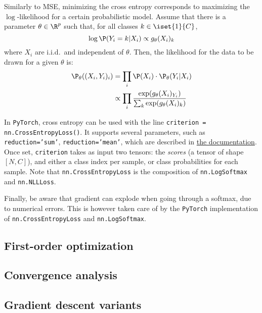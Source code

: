 Similarly to MSE, minimizing the cross entropy corresponds to maximizing the $\log$-likelihood for a certain probabilistic model. Assume that there is a parameter $\theta\in\R^p$ such that, for all classes $k\in\iset{1}{C}$,
\begin{equation*}
    \log\P(Y_i=k|X_i) \propto g_\theta(X_i)_k
\end{equation*}
where $X_i$ are i.i.d.~and independent of $\theta$. Then, the likelihood for the data to be drawn for a given $\theta$ is:
\begin{equation*}
    \begin{aligned}
        \P_\theta((X_i,Y_i)_i) &= \prod_i\P(X_i)\cdot\P_\theta(Y_i|X_i)\\
        &\propto\prod_i\frac{\exp(g_\theta(X_i)_{Y_i})}{\sum_k\exp(g_\theta(X_i)_k)}        
    \end{aligned}
\end{equation*}

In \texttt{PyTorch}, cross entropy can be used with the line \texttt{criterion = nn.CrossEntropyLoss()}. It supports several parameters, such as \texttt{reduction='sum'}, \texttt{reduction='mean'}, which are described in \href{https://pytorch.org/docs/stable/generated/torch.nn.MSELoss.html}{the documentation}. Once set, \texttt{criterion} takes as input two tensors: the \emph{scores} (a tensor of shape $[N,C]$), and either a class index per sample, or class probabilities for each sample. Note that \texttt{nn.CrossEntropyLoss} is the composition of \texttt{nn.LogSoftmax} and \texttt{nn.NLLLoss}.

Finally, be aware that gradient can explode when going through a softmax, due to numerical errors. This is however taken care of by the \texttt{PyTorch} implementation of \texttt{nn.CrossEntropyLoss} and \texttt{nn.LogSoftmax}.

\subsection{First-order optimization}

\subsection{Convergence analysis}

\subsection{Gradient descent variants}